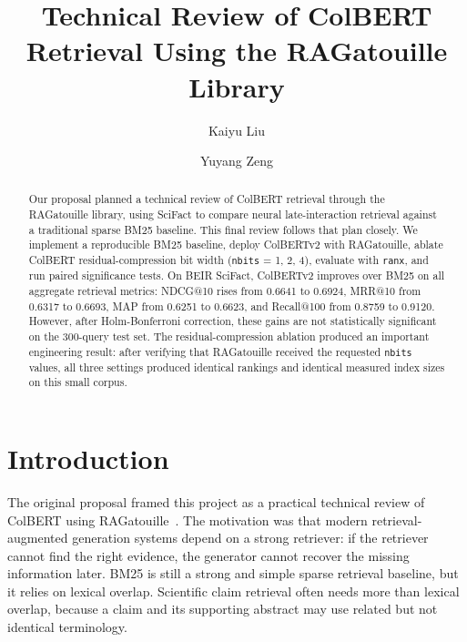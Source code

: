 \documentclass[sigconf,nonacm]{acmart}
\begin{document}
\title{Technical Review of ColBERT Retrieval Using the RAGatouille Library}

\author{Kaiyu Liu}

\author{Yuyang Zeng}

\renewcommand{\shortauthors}{Liu and Zeng}

\begin{abstract}
Our proposal planned a technical review of ColBERT retrieval through the
RAGatouille library, using SciFact to compare neural late-interaction retrieval
against a traditional sparse BM25 baseline. This final review follows that plan
closely. We implement a reproducible BM25 baseline, deploy ColBERTv2 with
RAGatouille, ablate ColBERT residual-compression bit width
(\texttt{nbits} = 1, 2, 4), evaluate with \texttt{ranx}, and run paired
significance tests. On BEIR SciFact, ColBERTv2 improves over BM25 on all
aggregate retrieval metrics: NDCG@10 rises from 0.6641 to 0.6924, MRR@10 from
0.6317 to 0.6693, MAP from 0.6251 to 0.6623, and Recall@100 from 0.8759 to
0.9120. However, after Holm-Bonferroni correction, these gains are not
statistically significant on the 300-query test set. The residual-compression
ablation produced an important engineering result: after verifying that
RAGatouille received the requested \texttt{nbits} values, all three settings
produced identical rankings and identical measured index sizes on this small
corpus.
\end{abstract}


\maketitle

\section{Introduction}

The original proposal framed this project as a practical technical review of
ColBERT using RAGatouille~\cite{khattab2020colbert,ragatouille}. The motivation
was that modern retrieval-augmented generation systems depend on a strong
retriever: if the retriever cannot find the right evidence, the generator cannot
recover the missing information later. BM25 is still a strong and simple sparse
retrieval baseline, but it relies on lexical overlap. Scientific claim
retrieval often needs more than lexical overlap, because a claim and its
supporting abstract may use related but not identical terminology.
\end{document}
